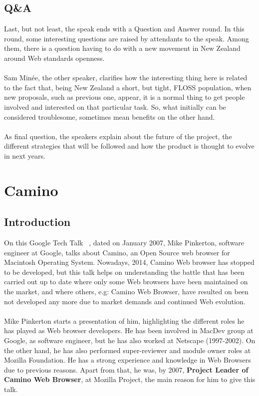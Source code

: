 \documentclass[11pt]{article}
\begin{document}
\subsection{Q\&A}
  Last, but not least, the speak ends with a Question and Answer round. In this round, some interesting questions are raised by attendants to the speak. Among them, there is a question having to do with a new movement in New Zealand around Web standards openness.\\
\\
  Sam Minée, the other speaker, clarifies how the interesting thing here is related to the fact that, being New Zealand a short, but tight, FLOSS population, when new proposals, such as previous one, appear, it is a normal thing to get people involved and interested on that particular task. So, what initially can be considered troublesome, sometimes mean benefits on the other hand.\\
\\
As final question, the speakers explain about the future of the project, the different strategies that will be followed and how the product is thought to evolve in next years.

\pagebreak

\section{Camino}
\label{sec:camino}

\subsection{Introduction}
On this Google Tech Talk ~\cite{TALK03}, dated on January 2007, Mike Pinkerton, software engineer at Google, talks about Camino, an Open Source web browser for Macintosh Operating System. Nowadays, 2014, Camino Web browser has stopped to be developed, but this talk helps on understanding the battle that has been carried out up to date where only some Web browsers have been maintained on the market, and where others, e.g: Camino Web Browser, have resulted on been not developed any more due to market demands and continued Web evolution.\\
\\
Mike Pinkerton starts a presentation of him, highlighting the different roles he has played as Web browser developers. He has been involved in MacDev group at Google, as software engineer, but he has also worked at Netscape (1997-2002). On the other hand, he has also performed super-reviewer and module owner roles at Mozilla Foundation. He has a strong experience and knowledge in Web Browsers due to previous reasons. Apart from that, he was, by 2007, \textbf{Project Leader of Camino Web Browser}, at Mozilla Project, the main reason for him to give this talk.
\end{document}
